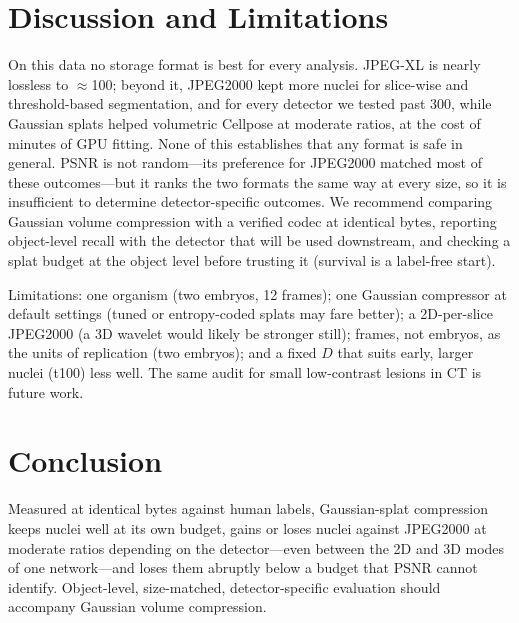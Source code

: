 \documentclass[conference]{IEEEtran}
\begin{document}
\section{Discussion and Limitations}
On this data no storage format is best for every analysis. JPEG-XL is nearly lossless to
$\approx$\SI{100}{\times}; beyond it, JPEG2000 kept more nuclei for slice-wise and
threshold-based segmentation, and for every detector we tested past \SI{300}{\times}, while
Gaussian splats helped volumetric Cellpose at moderate ratios, at the cost of minutes of GPU
fitting. None of this establishes that any format is safe in general. PSNR is not
random---its preference for JPEG2000 matched most of these outcomes---but it ranks the two
formats the same way at every size, so it is insufficient to determine detector-specific
outcomes. We recommend comparing
Gaussian volume compression with a verified codec at identical bytes, reporting object-level
recall with the detector that will be used downstream, and checking a splat budget at the
object level before trusting it (survival is a label-free start).

Limitations: one organism (two embryos, 12 frames); one Gaussian compressor at default
settings (tuned or entropy-coded splats may fare better); a 2D-per-slice JPEG2000 (a 3D wavelet
would likely be stronger still); frames, not embryos, as the units of replication (two
embryos); and a fixed $D$ that suits early, larger nuclei (t100) less well. The same audit for
small low-contrast lesions in CT is future work.

\section{Conclusion}
Measured at identical bytes against human labels, Gaussian-splat compression keeps nuclei
well at its own budget, gains or loses nuclei against JPEG2000 at moderate ratios depending
on the detector---even between the 2D and 3D modes of one network---and loses them abruptly
below a budget that PSNR cannot identify.
Object-level, size-matched, detector-specific evaluation should accompany Gaussian volume
compression.



\end{document}

